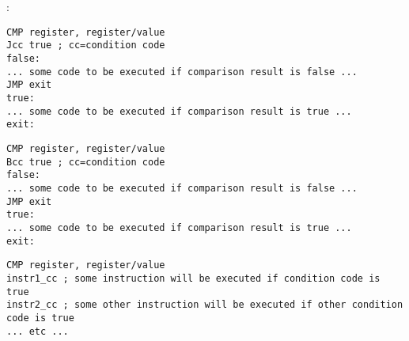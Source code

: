 \chapter{}
\label{sec:Jcc}



\section{\Conclusion{}}

:

\begin{lstlisting}[caption=x86]
CMP register, register/value
Jcc true ; cc=condition code
false:
... some code to be executed if comparison result is false ...
JMP exit 
true:
... some code to be executed if comparison result is true ...
exit:
\end{lstlisting}

\begin{lstlisting}[caption=ARM]
CMP register, register/value
Bcc true ; cc=condition code
false:
... some code to be executed if comparison result is false ...
JMP exit 
true:
... some code to be executed if comparison result is true ...
exit:
\end{lstlisting}


\begin{lstlisting}[caption=ARM]
CMP register, register/value
instr1_cc ; some instruction will be executed if condition code is true
instr2_cc ; some other instruction will be executed if other condition code is true
... etc ...
\end{lstlisting}

